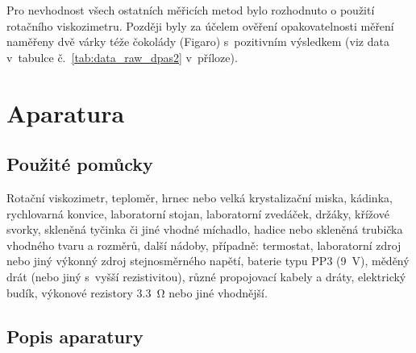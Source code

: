 \documentclass[12pt]{article}
\begin{document}
Pro nevhodnost všech ostatních měřicích metod bylo rozhodnuto o použití rotačního viskozimetru. Později byly za účelem ověření opakovatelnosti měření naměřeny dvě várky téže čokolády (Figaro) s~pozitivním výsledkem (viz data v~tabulce č.~\ref{tab:data_raw_dpas2} v~příloze).

\newpage%
\section{Aparatura}%

\subsection{Použité pomůcky}%

Rotační viskozimetr, teploměr, hrnec nebo velká krystalizační miska, kádinka, rychlovarná konvice, laboratorní stojan, laboratorní zvedáček, držáky, křížové svorky, skleněná tyčinka či jiné vhodné míchadlo, hadice nebo skleněná trubička vhodného tvaru a rozměrů, další nádoby, případně: termostat, laboratorní zdroj nebo jiný výkonný zdroj stejnosměrného napětí, baterie typu PP3 (\SI{9}{\volt}), měděný drát (nebo jiný s~vyšší rezistivitou), různé propojovací kabely a dráty, elektrický budík, výkonové rezistory \SI{3,3}{\ohm} nebo jiné vhodnější.

\subsection{Popis aparatury}%
\end{document}
